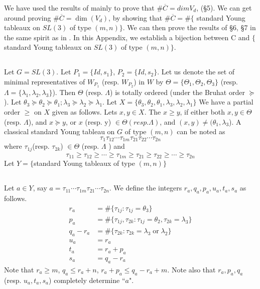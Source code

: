 We have used the results of \cite{art9-keyL2} mainly to prove that $\#\overline{C}= dimV_{d}$, (\S 5). We can get
around proving $\#\overline{C}= \dim(V_{d})$, by showing that $\#\overline{C}= \#\{$ standard Young tableaux on $SL(3)$ of type $(m,n)\}$. We can then prove the results of \S 6, \S 7 in the same spirit as in \cite{art9-keyLS}. In this Appendix, we establish a bijection between C and $\{$standard Young tableaux on $SL(3)$ of type $(m,n)\}$. 

\subsection{}\label{art9-subsec-8.1}
Let $G = SL(3)$. Let $P_{1}= \{Id, s_{1}\}$, $P_{2} = \{Id, s_{2}\}$. Let us denote the set of minimal representatives of $W_{P_{1}}$ (resp. $W_{P_{2}}$) in $W$ by $\Theta = \{ \Theta_{1}, \Theta_{2},\Theta_{3}\}$ (resp. $\Lambda=\{ \lambda_{1},\lambda_{2}, \lambda_{3}\}$). Then $\Theta$ (resp. $\Lambda$) is totally ordered (under the Bruhat order $\succeq$ ). Let $\theta_{3} \succeq \theta_{2} \succeq \theta_{1}; \lambda_{3} \succeq \lambda_{2} \succeq \lambda_{1}$. Let $X= \{ \theta_{3}, \theta_{2}, \theta_{1}, \lambda_{3}, \lambda_{2}, \lambda_{1}\}$ We have a partial order $\geq$ on $X$ given as follows. Lets $x,y \in X$. The $x \geq y$, if either both $ x,y \in \Theta$ (resp. $\Lambda$), and $x \succeq y$, or $x$ (resp. y) $\in \Theta (resp. \Lambda)$, and $(x,y) \neq (\theta_{1},\lambda_{3}$). A classical standard Young tableau on $G$ of type $(m,n)$ can  be noted as
 $$
\tau_{1}\tau_{12}\cdots \tau_{1m}\tau_{21}\tau_{22}\cdots \tau_{2n}
 $$
where $\tau_{1j}$(resp. $\tau_{2k}$) $\in \Theta$ (resp. $\Lambda$ ) and
$$
\tau_{11} \geq \tau_{12} \geq \cdots \geq \tau_{1m} \geq \tau_{21} \geq \tau_{22} \geq \cdots \geq \tau_{2n}
$$
Let $Y =\{$standard Young tableaux of type $(m,n)\}$

\subsection{}\label{art9-subsec-8.2}
Let $a \in Y$, say $a = \tau_{11} \cdots \tau_{1m}\tau_{21} \cdots \tau_{2n}$. We define the integers $r_{a}, q_{a}, p_{a}, u_{a}, t_{a}, s_{a}$ as follows.
\begin{align*}
r_{a} &= \#\{\tau_{1j}: \tau_{1j} = \theta_{3} \}\\
p_{a} &= \# \{\tau_{1j}, \tau_{2k} : \tau_{1j}= \theta_{2}, \tau_{2k} = \lambda_{3} \}\\
q_{a}-r_{a} &= \# \{ \tau_{2k} : \tau_{2k} = \lambda_{3} \; \text{or} \; \lambda_{2} \}\\
u_{a} &= r_{a}\\
t_{a} &= r_{a}+p_{a}\\
s_{a} &= q_{a}-r_{a}
\end{align*}
Note that $ r_{a} \geq m$, $ q_{a}\leq r_{a} + n$, $r_{a} + p_{a} \leq q_{a}-r_{a} +m$. Note also that $r_{a}, p_{a}, q_{a}$ (resp. $u_{a}, t_{a}, s_{a}$) completely determine ``$a$". 


